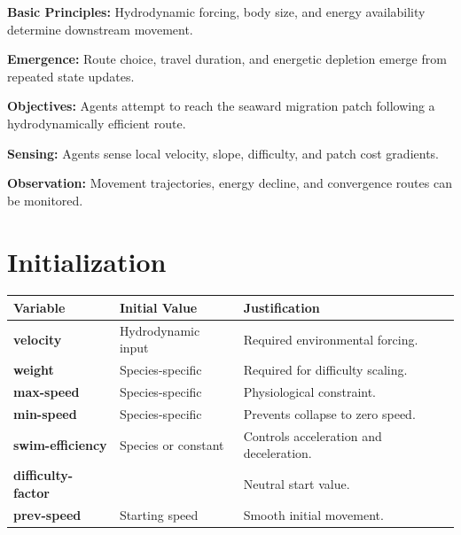 \documentclass[
]{book}
\begin{document}
\textbf{Basic Principles:} Hydrodynamic forcing, body size, and energy
availability determine downstream movement.

\textbf{Emergence:} Route choice, travel duration, and energetic depletion
emerge from repeated state updates.

\textbf{Objectives:} Agents attempt to reach the seaward migration patch
following a hydrodynamically efficient route.

\textbf{Sensing:} Agents sense local velocity, slope, difficulty, and patch
cost gradients.

\textbf{Observation:} Movement trajectories, energy decline, and convergence
routes can be monitored.

\section{Initialization}\label{initialization-8}

\begin{longtable}[]{@{}
  >{\centering\arraybackslash}p{}
  >{\centering\arraybackslash}p{}
  >{\centering\arraybackslash}p{}@{}}
\toprule\noalign{}
\begin{minipage}[b]{\linewidth}\centering
Variable
\end{minipage} & \begin{minipage}[b]{\linewidth}\centering
Initial Value
\end{minipage} & \begin{minipage}[b]{\linewidth}\centering
Justification
\end{minipage} \\
\midrule\noalign{}
\endhead
\bottomrule\noalign{}
\endlastfoot
\textbf{velocity} & Hydrodynamic input & Required environmental forcing. \\
\textbf{weight} & Species-specific & Required for difficulty scaling. \\
\textbf{max-speed} & Species-specific & Physiological constraint. \\
\textbf{min-speed} & Species-specific & Prevents collapse to zero speed. \\
\textbf{swim-efficiency} & Species or constant & Controls acceleration and deceleration. \\
\textbf{difficulty-factor} & 1 & Neutral start value. \\
\textbf{prev-speed} & Starting speed & Smooth initial movement. \\
\end{longtable}
\end{document}
